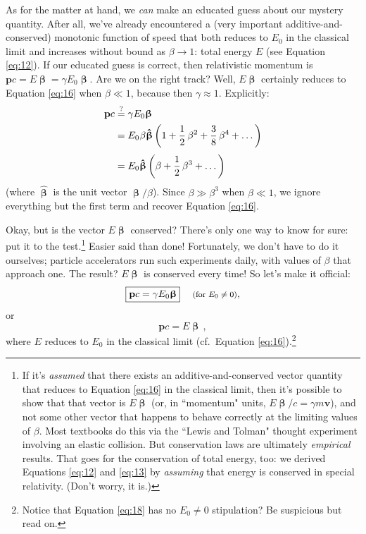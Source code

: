 \documentclass[12pt]{article}
\renewcommand{\vv}[1]{\mathbf{#1}}
\newcommand{\vvbeta}{\bm{\upbeta}}
\newcommand{\hatbeta}{\bm{\hat{\upbeta}}}
\begin{document}
As for the matter at hand, we \emph{can} make an educated guess about our mystery quantity. After all, we've already encountered a (very important additive-and-conserved) monotonic function of speed that both reduces to $E_0$ in the classical limit and increases without bound as $\beta \rightarrow 1$: total energy $E$ (see Equation \ref{eq:12}). If our educated guess is correct, then relativistic momentum is $\vv p c = E \vvbeta = \gamma E_0 \vvbeta$. Are we on the right track? Well, $E \vvbeta$ certainly reduces to Equation \ref{eq:16} when $\beta \ll 1$, because then $\gamma \approx 1$. Explicitly:
\begin{equation*}\begin{split}
\vv p c &\stackrel{?}{=}\gamma E_0 \vvbeta \\
&= E_0 \mkern.5mu \beta \hatbeta \left( 1 + \dfrac{1}{2} \, \beta ^2 +  \dfrac {3}{8} \, \beta ^4 + \dots  \right) \\[3pt]
&= E_0 \hatbeta \left( \beta + \dfrac{1}{2} \, \beta^3 + \dots \right)
\end{split}\end{equation*}
(where $\hatbeta$ is the unit vector $\vvbeta / \beta$). Since $\beta \gg \beta^3$ when $\beta \ll 1$, we ignore everything but the first term and recover Equation \ref{eq:16}.

Okay, but is the vector $E \vvbeta$ conserved? There's only one way to know for sure: put it to the test.\footnote{If it's \emph{assumed} that there exists an additive-and-conserved vector quantity that reduces to Equation \ref{eq:16} in the classical limit, then it's possible to show that that vector is $E \vvbeta$ (or, in ``momentum" units, $E \vvbeta/c = \gamma m \vv v$), and not some other vector that happens to behave correctly at the limiting values of $\beta$. Most textbooks do this via the ``Lewis and Tolman" thought experiment involving an elastic collision. But conservation laws are ultimately \emph{empirical} results. That goes for the conservation of total energy, too: we derived Equations \ref{eq:12} and \ref{eq:13} by \emph{assuming} that energy is conserved in special relativity. (Don't worry, it is.)} Easier said than done! Fortunately, we don't have to do it ourselves; particle accelerators run such experiments daily, with values of $\beta$ that approach one. The result? $E \vvbeta$ is conserved every time! So let's make it official:
\begin{equation}\label{eq:17}
\boxed{\vv p c = \gamma E_0 \vvbeta}  \quad \textrm{\footnotesize{ (for $E_0 \neq 0$)}},
\end{equation}
or
\begin{equation}\label{eq:18}
\boxed{\vv p c = E \vvbeta} \, ,
\end{equation}
where $E$ reduces to $E_0$ in the classical limit (cf.\ Equation \ref{eq:16}).\footnote{Notice that Equation \ref{eq:18} has no $E_0 \neq 0$ stipulation? Be suspicious but read on.}
\end{document}
